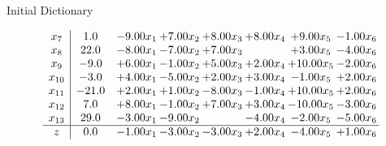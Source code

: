 \documentclass[8pt]{article}
\begin{document}
Initial Dictionary 

\[\begin{array}{c| c c@{\hskip 2pt} c@{\hskip 2pt} c@{\hskip 2pt} c@{\hskip 2pt} c@{\hskip 2pt} c@{\hskip 2pt} }
 x_{7}   &  1.0 & -9.00 x_{1} & +  7.00 x_{2} & +  8.00 x_{3} & +  8.00 x_{4} & +  9.00 x_{5} & -1.00 x_{6}\\
 x_{8}   &  22.0 & -8.00 x_{1} & -7.00 x_{2} & +  7.00 x_{3} &   & +  3.00 x_{5} & -4.00 x_{6}\\
 x_{9}   &  -9.0 & +  6.00 x_{1} & -1.00 x_{2} & +  5.00 x_{3} & +  2.00 x_{4} & + 10.00 x_{5} & -2.00 x_{6}\\
 x_{10}   &  -3.0 & +  4.00 x_{1} & -5.00 x_{2} & +  2.00 x_{3} & +  3.00 x_{4} & -1.00 x_{5} & +  2.00 x_{6}\\
 x_{11}   &  -21.0 & +  2.00 x_{1} & +  1.00 x_{2} & -8.00 x_{3} & -1.00 x_{4} & + 10.00 x_{5} & +  2.00 x_{6}\\
 x_{12}   &  7.0 & +  8.00 x_{1} & -1.00 x_{2} & +  7.00 x_{3} & +  3.00 x_{4} & -10.00 x_{5} & -3.00 x_{6}\\
 x_{13}   &  29.0 & -3.00 x_{1} & -9.00 x_{2} &   & -4.00 x_{4} & -2.00 x_{5} & -5.00 x_{6}\\
\hline
z    &  0.0 & -1.00 x_{1} & -3.00 x_{2} & -3.00 x_{3} & +  2.00 x_{4} & -4.00 x_{5} & +  1.00 x_{6}\\
\end{array}\]
\end{document}
